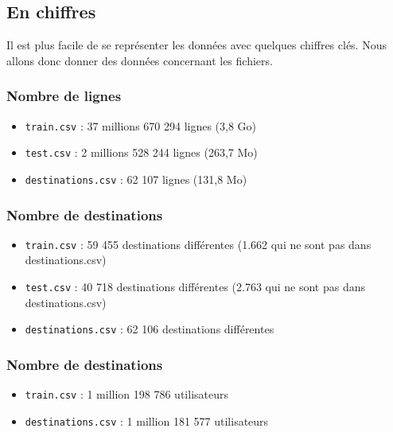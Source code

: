 \subsection{En chiffres}
\label{chiffres}

Il est plus facile de se représenter les données avec quelques chiffres clés. Nous allons donc donner des données concernant les fichiers.

\subsubsection{Nombre de lignes}

\begin{itemize}[label=$\circ$]
	\item \verb|train.csv| : 37 millions 670 294 lignes (3,8 Go)
	\item \verb|test.csv| : 2 millions 528 244 lignes (263,7 Mo)
	\item \verb|destinations.csv| : 62 107 lignes (131,8 Mo)
\end{itemize}

\subsubsection{Nombre de destinations}
\label{chiffres_destinations}

\begin{itemize}[label=$\circ$]
	\item \verb|train.csv| : 59 455 destinations différentes (1.662 qui ne sont pas dans destinations.csv)
	\item \verb|test.csv| : 40 718 destinations différentes (2.763 qui ne sont pas dans destinations.csv)
	\item \verb|destinations.csv| : 62 106 destinations différentes
\end{itemize}


\subsubsection{Nombre de destinations}

\begin{itemize}[label=$\circ$]
	\item \verb|train.csv| : 1 million 198 786 utilisateurs
	\item \verb|destinations.csv| : 1 million 181 577 utilisateurs
\end{itemize}


